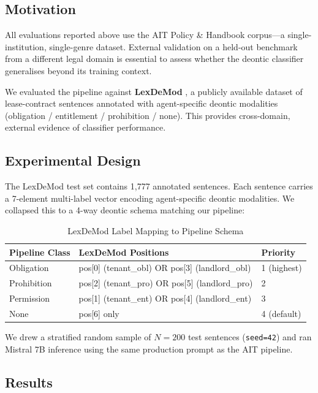 \subsection{Motivation}

All evaluations reported above use the AIT Policy \& Handbook corpus---a single-institution, single-genre dataset. External validation on a held-out benchmark from a different legal domain is essential to assess whether the deontic classifier generalises beyond its training context.

We evaluated the pipeline against \textbf{LexDeMod} \citep{sancheti2022agent}, a publicly available dataset of lease-contract sentences annotated with agent-specific deontic modalities (obligation / entitlement / prohibition / none). This provides cross-domain, external evidence of classifier performance.

\subsection{Experimental Design}

The LexDeMod test set contains 1,777 annotated sentences. Each sentence carries a 7-element multi-label vector encoding agent-specific deontic modalities. We collapsed this to a 4-way deontic schema matching our pipeline:

\begin{table}[htbp]
\centering
\caption{LexDeMod Label Mapping to Pipeline Schema}
\label{tab:lexdemod-mapping}
\begin{tabular}{lll}
\toprule
\textbf{Pipeline Class} & \textbf{LexDeMod Positions} & \textbf{Priority} \\
\midrule
Obligation  & pos[0] (tenant\_obl) OR pos[3] (landlord\_obl) & 1 (highest) \\
Prohibition & pos[2] (tenant\_pro) OR pos[5] (landlord\_pro) & 2 \\
Permission  & pos[1] (tenant\_ent) OR pos[4] (landlord\_ent) & 3 \\
None        & pos[6] only                                     & 4 (default) \\
\bottomrule
\end{tabular}
\end{table}

We drew a stratified random sample of $N = 200$ test sentences (\texttt{seed=42}) and ran Mistral 7B inference using the same production prompt as the AIT pipeline.

\subsection{Results}


